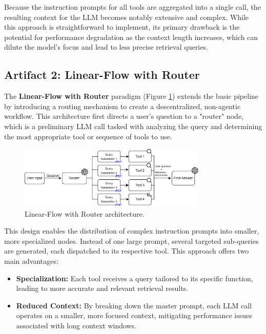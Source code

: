         Because the instruction prompts for all tools are aggregated into a single call, the resulting context for the LLM becomes notably extensive and complex. While this approach is straightforward to implement, its primary drawback is the potential for performance degradation as the context length increases, which can dilute the model's focus and lead to less precise retrieval queries.
        

    \subsection{Artifact 2: Linear-Flow with Router}
    
        The \textbf{Linear-Flow with Router} paradigm (Figure \ref{fig:diagrama_linear_w_router}) extends the basic pipeline by introducing a routing mechanism to create a descentralized, non-agentic workflow. This architecture first directs a user's question to a "router" node, which is a preliminary LLM call tasked with analyzing the query and determining the most appropriate tool or sequence of tools to use.

        \begin{figure}[h]
            \centering
            \includegraphics[width=0.8\textwidth]{images_exp2/diagrams/diagrama_linear_w_router.png}
            \caption{Linear-Flow with Router architecture.}
            \label{fig:diagrama_linear_w_router}
        \end{figure}

        This design enables the distribution of complex instruction prompts into smaller, more specialized nodes. Instead of one large prompt, several targeted sub-queries are generated, each dispatched to its respective tool. This approach offers two main advantages:

        \begin{itemize}
            \item \textbf{Specialization:} Each tool receives a query tailored to its specific function, leading to more accurate and relevant retrieval results.
            \item \textbf{Reduced Context:} By breaking down the master prompt, each LLM call operates on a smaller, more focused context, mitigating performance issues associated with long context windows.
        \end{itemize}


